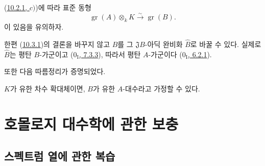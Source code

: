 (\hyperref[0.10.2.1-fr]{10.2.1, $c)$})에 따라 표준 동형
\[
\label{0.10.3.1.5-fr}
  \operatorname{gr}(A)\otimes_k K\xrightarrow{\sim}\operatorname{gr}(B).
  \tag{10.3.1.5}
\]
이 있음을 유의하자.

한편 (\hyperref[0.10.3.1-fr]{10.3.1})의 결론을 바꾸지 않고 $B$를 그
$\mathfrak J B$-아딕 완비화 $\widehat B$로 바꿀 수 있다. 실제로
$\widehat B$는 평탄 $B$-가군이고
(\hyperref[0.7.3.3-ko]{$0_{\mathrm I}$, 7.3.3}), 따라서 평탄
$A$-가군이다 (\hyperref[0.6.2.1-ko]{$0_{\mathrm I}$, 6.2.1}).

또한 다음 따름정리가 증명되었다.

\begin{corollary}[10.3.2]
\label{0.10.3.2-fr}
$K$가 유한 차수 확대체이면, $B$가 유한 $A$-대수라고 가정할 수 있다.
\end{corollary}

\section{호몰로지 대수학에 관한 보충}
\label{section:0.11-fr}

\subsection{스펙트럼 열에 관한 복습}
\label{subsection:0.11.1-fr}

